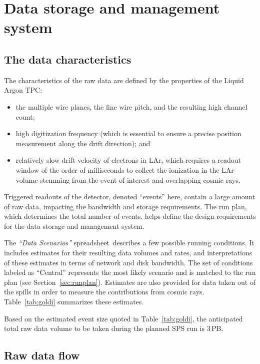 \section{Data storage and management system}

\subsection{The \pdsp data characteristics}
The characteristics of the raw \pdsp data are defined by the
properties of the \pdsp Liquid Argon TPC:
\begin{itemize}
\item the multiple wire planes, the fine wire pitch, and the resulting high channel count;
\item high digitization frequency (which is essential to ensure a precise position measurement along the drift direction); and
\item relatively slow drift velocity of electrons in LAr, which requires a readout window of the order of milliseconds  to collect
the ionization in the LAr volume stemming from the event of interest and overlapping cosmic rays.
\end{itemize}

Triggered readouts of the detector, denoted ``events'' here, 
contain a large amount of raw data, impacting the bandwidth and
storage requirements.   The run plan, which determines the total number of events, 
helps define the design requirements for the data storage and management system.

The \textit{``\pdsp Data Scenarios''} spreadsheet\,\cite{data_spreadsheet}  %
describes a few possible running conditions. It includes estimates for their
resulting data volumes and rates, and interpretations of these estimates in terms of
network and disk bandwidth. The set of conditions labeled as ``Central'' represents the most likely scenario
and is matched to the run plan (see Section~\ref{sec:runplan}).
Estimates are also provided for data taken out of the spills in order to measure the contributions from cosmic rays.
Table~\ref{tab:goldi} summarizes these estimates.

Based on the estimated event size quoted in Table~\ref{tab:goldi},  the anticipated total raw data volume to be 
taken during the planned SPS run is 3\,PB.



\subsection{Raw data flow}
\label{sec:raw_concept}

